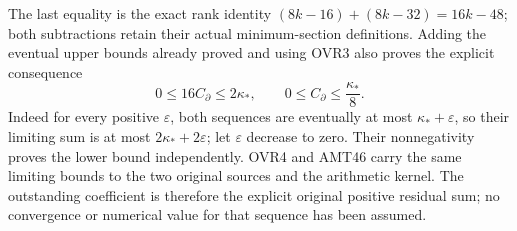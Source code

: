 \documentclass[11pt,a4paper]{article}
\begin{document}
The last equality is the exact rank identity
$(8k-16)+(8k-32)=16k-48$; both subtractions retain their actual
minimum-section definitions. Adding the eventual upper bounds
already proved and using OVR3 also proves the explicit consequence
\[
 0\le16C_\partial\le2\kappa_*,\qquad
 0\le C_\partial\le\frac{\kappa_*}{8}.
 \tag{OVR11}
\]
Indeed for every positive $\varepsilon$, both sequences are eventually
at most $\kappa_*+\varepsilon$, so their limiting sum is at most
$2\kappa_*+2\varepsilon$; let $\varepsilon$ decrease to zero.
Their nonnegativity proves the lower bound independently.
OVR4 and AMT46 carry the same limiting bounds to the two original
sources and the arithmetic kernel. The outstanding coefficient is
therefore the explicit original positive residual sum; no convergence
or numerical value for that sequence has been assumed.

\end{document}
